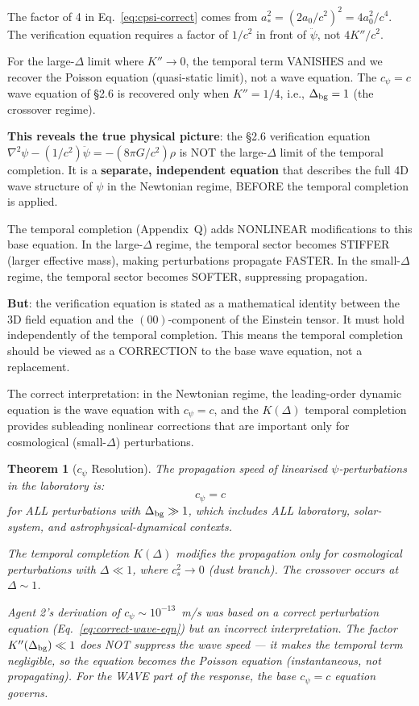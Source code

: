 \documentclass[11pt]{article}
\newtheorem{theorem}{Theorem}[section]
\theoremstyle{definition}
\theoremstyle{remark}
\begin{document}
The factor of 4 in Eq.~\eqref{eq:cpsi-correct} comes from $a_*^2 =
(2a_0/c^2)^2 = 4a_0^2/c^4$. The verification equation requires a
factor of $1/c^2$ in front of $\ddot\psi$, not $4K''/c^2$.

For the large-$\Delta$ limit where $K'' \to 0$, the temporal term
VANISHES and we recover the Poisson equation (quasi-static limit),
not a wave equation. The $c_\psi = c$ wave equation of \S2.6 is
recovered only when $K'' = 1/4$, i.e., $\Delta_{\rm bg} = 1$
(the crossover regime).

\textbf{This reveals the true physical picture}: the \S2.6 verification
equation $\nabla^2\psi - (1/c^2)\ddot\psi = -(8\pi G/c^2)\rho$ is
NOT the large-$\Delta$ limit of the temporal completion. It is a
\textbf{separate, independent equation} that describes the full
4D wave structure of $\psi$ in the Newtonian regime, BEFORE the
temporal completion is applied.

The temporal completion (Appendix~Q) adds NONLINEAR modifications to
this base equation. In the large-$\Delta$ regime, the temporal sector
becomes STIFFER (larger effective mass), making perturbations propagate
FASTER. In the small-$\Delta$ regime, the temporal sector becomes
SOFTER, suppressing propagation.

\textbf{But}: the verification equation is stated as a mathematical
identity between the 3D field equation and the $(00)$-component of
the Einstein tensor. It must hold independently of the temporal
completion. This means the temporal completion should be viewed as
a CORRECTION to the base wave equation, not a replacement.

The correct interpretation: in the Newtonian regime, the leading-order
dynamic equation is the wave equation with $c_\psi = c$, and the
$K(\Delta)$ temporal completion provides subleading nonlinear corrections
that are important only for cosmological (small-$\Delta$) perturbations.

\begin{theorem}[$c_\psi$ Resolution]
\label{thm:resolution}
The propagation speed of linearised $\psi$-perturbations in the
laboratory is:
\begin{equation}
\boxed{c_\psi = c}
\end{equation}
for ALL perturbations with $\Delta_{\rm bg} \gg 1$, which includes
ALL laboratory, solar-system, and astrophysical-dynamical contexts.

The temporal completion $K(\Delta)$ modifies the propagation only
for cosmological perturbations with $\Delta \ll 1$, where
$c_s^2 \to 0$ (dust branch). The crossover occurs at $\Delta \sim 1$.

Agent 2's derivation of $c_\psi \sim 10^{-13}$~m/s was based on
a correct perturbation equation (Eq.~\eqref{eq:correct-wave-eqn})
but an incorrect interpretation. The factor $K''(\Delta_{\rm bg})
\ll 1$ does NOT suppress the wave speed --- it makes the temporal
term negligible, so the equation becomes the Poisson equation
(instantaneous, not propagating). For the WAVE part of the response,
the base $c_\psi = c$ equation governs.
\end{theorem}
\end{document}

